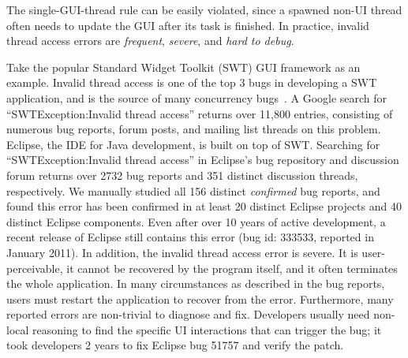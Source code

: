 The single-GUI-thread rule can be easily violated, since a spawned non-UI thread often needs to update
the GUI  after its  task is finished.
In practice, invalid thread access errors are \textit{frequent}, \textit{severe}, and \textit{hard to debug}.

Take the popular Standard Widget Toolkit (SWT) GUI framework as an example. 
Invalid thread access is one of the top 3 bugs in developing a SWT application, and is
the source of many concurrency bugs~\cite{top3bugs}.
A Google search for ``SWTException:Invalid thread access''  returns over 11,800 entries,
consisting of numerous bug reports, forum posts, and mailing list threads on
this problem. Eclipse, the IDE for Java development, is built on top of SWT\@.
Searching for ``SWTException:Invalid thread access'' in Eclipse's bug repository
and discussion forum returns over 2732 bug reports and 351 distinct discussion threads, respectively. 
We manually studied all 156 distinct \textit{confirmed} bug reports, and 
found this error has been confirmed in at least 20 distinct Eclipse projects
and 40 distinct Eclipse components. Even after over 10 years of active development,
a recent release of Eclipse still contains this error (bug id: 333533, reported in January 2011).
 In addition, the invalid thread access error
is severe. It is user-perceivable, it cannot be recovered by the program itself,
and it often terminates the whole application. In many circumstances as described in the bug reports,
users must restart the application to recover from the error.
Furthermore, many reported  errors are non-trivial to diagnose and fix.
Developers usually need non-local reasoning to find the specific
UI interactions that can trigger the bug;  it took developers 2 years
to fix Eclipse bug 51757 and verify the patch.

